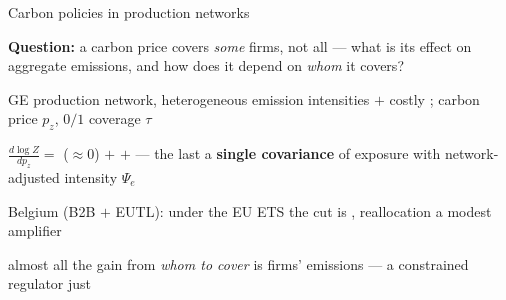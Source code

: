 
\begin{frame}{Carbon policies in production networks}

    \begin{tcolorbox}[colback=blue!4,colframe=blue!40!black]
        \textbf{Question:} a carbon price covers \emph{some} firms, not all --- what is its
        effect on aggregate emissions, and how does it depend on \emph{whom} it covers?
    \end{tcolorbox}

    \begin{wideitemize}
        \item \textbf{} GE production network, heterogeneous emission intensities $+$ costly ; carbon price $p_z$, $0/1$ coverage $\tau$
        \item \textbf{} $\tfrac{d\log Z}{dp_z} =$  ($\approx 0$) $+$  $+$  --- the last a \textbf{single covariance} of exposure with network-adjusted intensity $\Psi_e$
        \item \textbf{} Belgium (B2B $+$ EUTL): under the EU ETS the cut is , reallocation a modest amplifier
        \item \textbf{} almost all the gain from \emph{whom to cover} is firms'  emissions --- a constrained regulator just 
    \end{wideitemize}

\end{frame}

